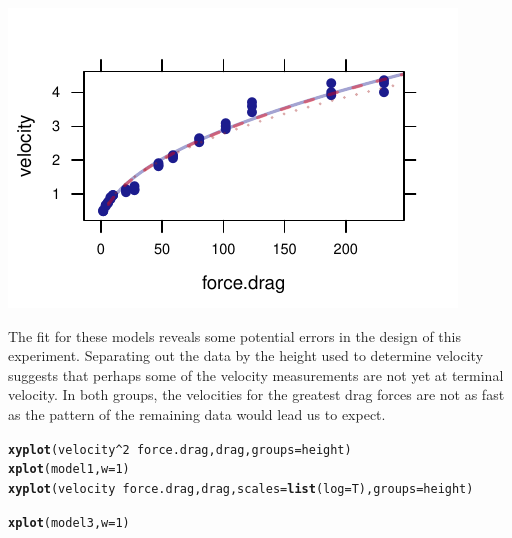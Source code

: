 \documentclass[twoside]{book}\usepackage[]{graphicx}\usepackage[]{xcolor}
\makeatletter
\def\maxwidth{ %
  \ifdim\Gin@nat@width>\linewidth
    \linewidth
  \else
    \Gin@nat@width
  \fi
}
\newcommand{\hlnum}[1]{\textcolor[rgb]{0.686,0.059,0.569}{#1}}%
\newcommand{\hlopt}[1]{\textcolor[rgb]{0,0,0}{#1}}%
\newcommand{\hlstd}[1]{\textcolor[rgb]{0.345,0.345,0.345}{#1}}%
\newcommand{\hlkwc}[1]{\textcolor[rgb]{0.333,0.667,0.333}{#1}}%
\newcommand{\hlkwd}[1]{\textcolor[rgb]{0.737,0.353,0.396}{\textbf{#1}}}%
\newenvironment{kframe}{%
 \def\at@end@of@kframe{}%
 \ifinner\ifhmode%
  \def\at@end@of@kframe{\end{minipage}}%
  \begin{minipage}{\columnwidth}%
 \fi\fi%
 \def\FrameCommand##1{\hskip\@totalleftmargin \hskip-\fboxsep
 \colorbox{shadecolor}{##1}\hskip-\fboxsep
     \hskip-\linewidth \hskip-\@totalleftmargin \hskip\columnwidth}%
 \MakeFramed {\advance\hsize-\width
   \@totalleftmargin\z@ \linewidth\hsize
   \@setminipage}}%
 {\par\unskip\endMakeFramed%
 \at@end@of@kframe}
\newenvironment{knitrout}{}{} %
\makeatother
\begin{document}
\begin{solution}
\begin{knitrout}
{\includegraphics[width=\maxwidth]{figures/fig-unnamed-chunk-222-4} 

}



\end{knitrout}

The fit for these models reveals some 
potential errors in the design of this experiment.  Separating out the data
by the height used to determine velocity suggests that perhaps some of the 
velocity measurements are not yet at terminal velocity.
In both groups, the velocities for the greatest drag forces are 
not as fast as the pattern of the remaining data would lead us to expect.

\begin{knitrout}
\color{fgcolor}\begin{kframe}
\begin{alltt}
\hlkwd{xyplot}\hlstd{(velocity}\hlopt{^}\hlnum{2} \hlopt{~} \hlstd{force.drag, drag,} \hlkwc{groups} \hlstd{= height)}
\hlkwd{xplot}\hlstd{(model1,} \hlkwc{w} \hlstd{=} \hlnum{1}\hlstd{)}
\hlkwd{xyplot}\hlstd{(velocity} \hlopt{~} \hlstd{force.drag, drag,} \hlkwc{scales} \hlstd{=} \hlkwd{list}\hlstd{(}\hlkwc{log} \hlstd{= T),} \hlkwc{groups} \hlstd{= height)}
\end{alltt}


{\ttfamily\noindent\bfseries{}}\begin{alltt}
\hlkwd{xplot}\hlstd{(model3,} \hlkwc{w} \hlstd{=} \hlnum{1}\hlstd{)}
\end{alltt}
\end{kframe}


\end{knitrout}
\end{solution}
\end{document}
